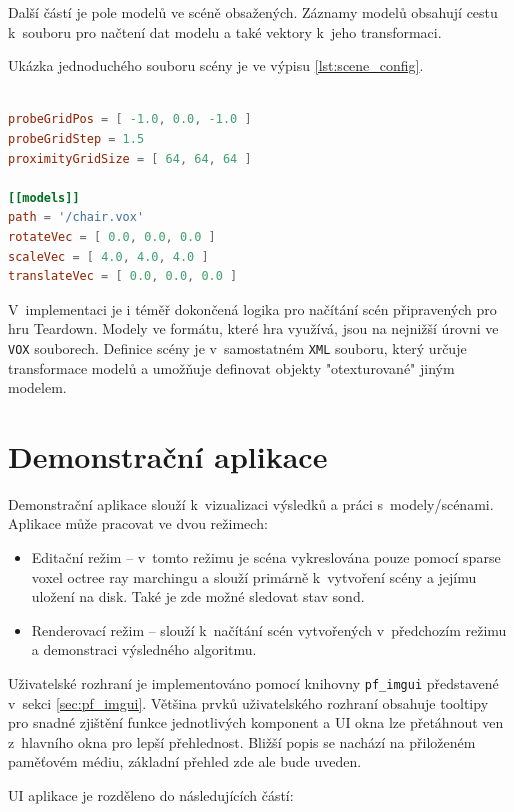 Další částí je pole modelů ve scéně obsažených. Záznamy modelů obsahují cestu k~souboru pro načtení dat modelu a také vektory k~jeho transformaci.

Ukázka jednoduchého souboru scény je ve výpisu \ref{lst:scene_config}.\\\\

\begin{lstlisting}[label={lst:scene_config}, language=toml, caption={Definice jednoduché scény}]
probeGridPos = [ -1.0, 0.0, -1.0 ]
probeGridStep = 1.5
proximityGridSize = [ 64, 64, 64 ]

[[models]]
path = '/chair.vox'
rotateVec = [ 0.0, 0.0, 0.0 ]
scaleVec = [ 4.0, 4.0, 4.0 ]
translateVec = [ 0.0, 0.0, 0.0 ]
\end{lstlisting}

V~implementaci je i téměř dokončená logika pro načítání scén připravených pro hru Teardown. Modely ve formátu, které hra využívá, jsou na nejnižší úrovni ve \texttt{VOX} souborech. Definice scény je v~samostatném \texttt{XML} souboru, který určuje transformace modelů a umožňuje definovat objekty "otexturované" jiným modelem.

\section{Demonstrační aplikace}\label{sec:demo_app}
Demonstrační aplikace slouží k~vizualizaci výsledků a práci s~modely/scénami. Aplikace může pracovat ve dvou režimech:
\begin{itemize}
    \item Editační režim -- v~tomto režimu je scéna vykreslována pouze pomocí sparse voxel octree ray marchingu a slouží primárně k~vytvoření scény a jejímu uložení na disk. Také je zde možné sledovat stav sond.
    \item Renderovací režim -- slouží k~načítání scén vytvořených v~předchozím režimu a demonstraci výsledného algoritmu.
\end{itemize}

Uživatelské rozhraní je implementováno pomocí knihovny \texttt{pf\_imgui} představené v~sekci \ref{sec:pf_imgui}. Většina prvků uživatelského rozhraní obsahuje tooltipy pro snadné zjištění funkce jednotlivých komponent a UI okna lze přetáhnout ven z~hlavního okna pro lepší přehlednost. Bližší popis se nachází na přiloženém paměťovém médiu, základní přehled zde ale bude uveden.

UI aplikace je rozděleno do následujících částí:

